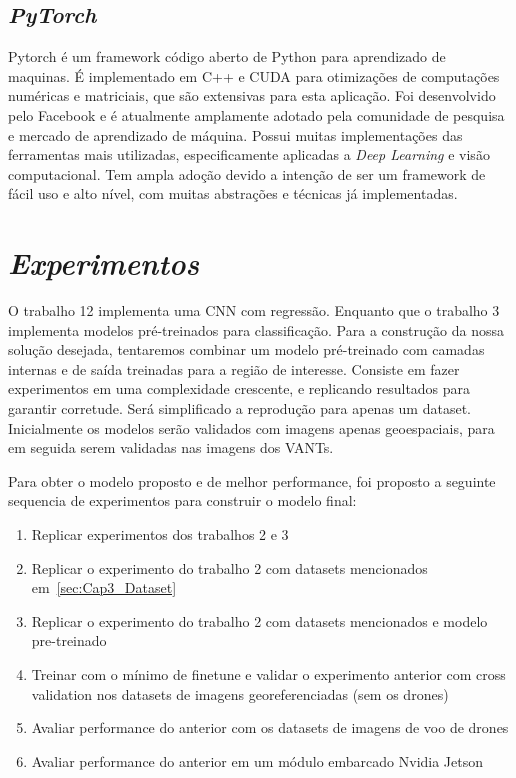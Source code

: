 \subsection{\textit{PyTorch}}\label{sec:Cap2_PyTorch}
Pytorch é um framework código aberto de Python para aprendizado de maquinas. É implementado em C++ e CUDA para otimizações de computações numéricas e matriciais, que são extensivas para esta aplicação.
Foi desenvolvido pelo Facebook e é atualmente amplamente adotado pela comunidade de pesquisa e mercado de aprendizado de máquina. Possui muitas implementações das ferramentas mais utilizadas, especificamente aplicadas a \textit{Deep Learning} e visão computacional. Tem ampla adoção devido a intenção de ser um framework de fácil uso e alto nível, com muitas abstrações e técnicas já implementadas.




\section{\textit{Experimentos}}\label{sec:Cap3_Experimentos}

O trabalho 12 implementa uma CNN com regressão. Enquanto que o trabalho 3 implementa modelos pré-treinados para classificação. Para a construção da nossa solução desejada, tentaremos combinar um modelo pré-treinado com camadas internas e de saída treinadas para a região de interesse.
Consiste em fazer experimentos em uma complexidade crescente, e replicando resultados para garantir corretude. Será simplificado a reprodução para apenas um dataset.
Inicialmente os modelos serão validados com imagens apenas geoespaciais, para em seguida serem validadas nas imagens dos VANTs.

Para obter o modelo proposto e de melhor performance, foi proposto a seguinte sequencia de experimentos para construir o modelo final:
\begin{enumerate}
\item  Replicar experimentos dos trabalhos 2 e 3
\item  Replicar o experimento do trabalho 2 com datasets mencionados em~\ref{sec:Cap3_Dataset}
\item  Replicar o experimento do trabalho 2 com datasets mencionados e modelo pre-treinado
\item Treinar com o mínimo de finetune e validar o experimento anterior com cross validation nos datasets de imagens georeferenciadas (sem os drones)
\item Avaliar performance do anterior com os datasets de imagens de voo de drones
\item Avaliar performance do anterior em um módulo embarcado Nvidia Jetson
\end{enumerate}


